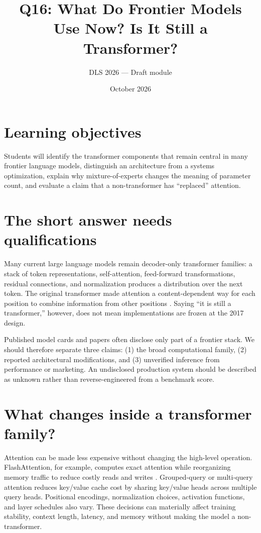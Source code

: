 \documentclass[11pt]{article}
\title{Q16: What Do Frontier Models Use Now? Is It Still a Transformer?}
\author{DLS 2026 --- Draft module}\date{October 2026}
\begin{document}
\maketitle
\section*{Learning objectives}
Students will identify the transformer components that remain central in many frontier language models, distinguish an architecture from a systems optimization, explain why mixture-of-experts changes the meaning of parameter count, and evaluate a claim that a non-transformer has ``replaced'' attention.

\section{The short answer needs qualifications}
Many current large language models remain decoder-only transformer families: a stack of token representations, self-attention, feed-forward transformations, residual connections, and normalization produces a distribution over the next token. The original transformer made attention a content-dependent way for each position to combine information from other positions \cite{vaswani2017attention}. Saying ``it is still a transformer,'' however, does not mean implementations are frozen at the 2017 design.

Published model cards and papers often disclose only part of a frontier stack. We should therefore separate three claims: (1) the broad computational family, (2) reported architectural modifications, and (3) unverified inference from performance or marketing. An undisclosed production system should be described as unknown rather than reverse-engineered from a benchmark score.

\section{What changes inside a transformer family?}
Attention can be made less expensive without changing the high-level operation. FlashAttention, for example, computes exact attention while reorganizing memory traffic to reduce costly reads and writes \cite{dao2022flashattention}. Grouped-query or multi-query attention reduces key/value cache cost by sharing key/value heads across multiple query heads. Positional encodings, normalization choices, activation functions, and layer schedules also vary. These decisions can materially affect training stability, context length, latency, and memory without making the model a non-transformer.
\end{document}
